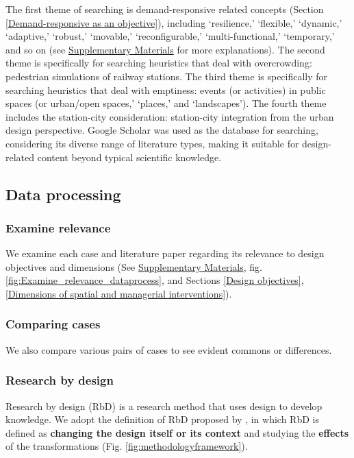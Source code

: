 \documentclass[]{article}
\begin{document}
The first theme of searching is demand-responsive related concepts (Section \ref{Demand-responsive as an objective}), including ‘resilience,’ ‘flexible,’ `dynamic,' `adaptive,' ‘robust,’ `movable,' `reconfigurable,' `multi-functional,' ‘temporary,’ and so on (see \href{https://github.com/1309928130/Paper3_SupplementaryMaterials/blob/main/SupplementaryMaterials.pdf}{Supplementary Materials} for more explanations). The second theme is specifically for searching heuristics that deal with overcrowding: pedestrian simulations of railway stations. The third theme is specifically for searching heuristics that deal with emptiness: events (or activities) in public spaces (or urban/open spaces,’ ‘places,’ and ‘landscapes’). The fourth theme includes the station-city consideration: station-city integration from the urban design perspective. Google Scholar was used as the database for searching, considering its diverse range of literature types, making it suitable for design-related content beyond typical scientific knowledge.


\subsection{Data processing}
\label{Data processing}

\subsubsection{Examine relevance}
\label{General data processing}
We examine each case and literature paper regarding its relevance to design objectives and dimensions (See \href{https://github.com/1309928130/Paper3_SupplementaryMaterials/blob/main/SupplementaryMaterials.pdf}{Supplementary Materials}, fig. \ref{fig:Examine_relevance_dataprocess}, and Sections \ref{Design objectives}, \ref{Dimensions of spatial and managerial interventions}). 





\subsubsection{Comparing cases} 
We also compare various pairs of cases to see evident commons or differences.

\subsubsection{Research by design}
\label{Research by design}
Research by design (RbD) is a research method that uses design to develop knowledge. We adopt the definition of RbD proposed by \citet{dejongeWAYSStudyResearch2002}, in which RbD is defined as \textbf{changing the design itself or its context} and studying the \textbf{effects} of the transformations (Fig. \ref{fig:methodologyframework}).
\end{document}
